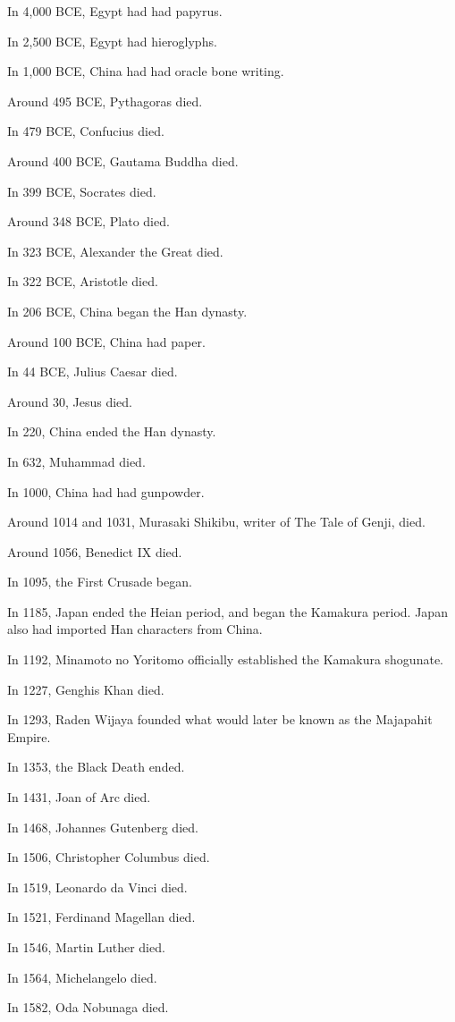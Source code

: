 In 4,000 BCE, Egypt had had papyrus.

In 2,500 BCE, Egypt had hieroglyphs.

In 1,000 BCE, China had had oracle bone writing.

Around 495 BCE, Pythagoras died.

In 479 BCE, Confucius died.

Around 400 BCE, Gautama Buddha died.

In 399 BCE, Socrates died.

Around 348 BCE, Plato died.

In 323 BCE, Alexander the Great died.

In 322 BCE, Aristotle died.

In 206 BCE, China began the Han dynasty.

Around 100 BCE, China had paper.

In 44 BCE, Julius Caesar died.

Around 30, Jesus died.

In 220, China ended the Han dynasty.

In 632, Muhammad died.

In 1000, China had had gunpowder.

Around 1014 and 1031, Murasaki Shikibu, writer of The Tale of Genji, died.

Around 1056, Benedict IX died.

In 1095, the First Crusade began.

In 1185, Japan ended the Heian period, and began the Kamakura period.
Japan also had imported Han characters from China.

In 1192, Minamoto no Yoritomo officially established the Kamakura shogunate.

In 1227, Genghis Khan died.

In 1293, Raden Wijaya founded what would later be known as the Majapahit Empire.

In 1353, the Black Death ended.

In 1431, Joan of Arc died.

In 1468, Johannes Gutenberg died.

In 1506, Christopher Columbus died.

In 1519, Leonardo da Vinci died.

In 1521, Ferdinand Magellan died.

In 1546, Martin Luther died.

In 1564, Michelangelo died.

In 1582, Oda Nobunaga died.

